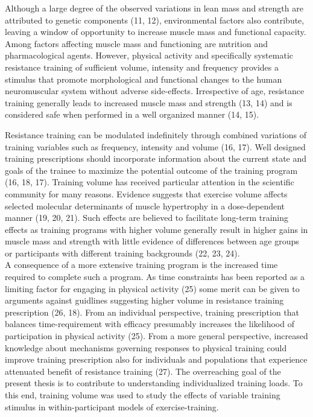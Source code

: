 \documentclass[twoside,10pt]{gihclass} %
\begin{document}
Although a large degree of the observed variations in lean mass and strength are attributed to genetic components
(11, 12),
environmental factors also contribute, leaving a window of opportunity to increase muscle mass and functional capacity. Among factors affecting muscle mass and functioning are nutrition and pharmacological agents. However, physical activity and specifically systematic resistance training of sufficient volume, intensity and frequency provides a stimulus that promote morphological and functional changes to the human neuromuscular system without adverse side-effects. Irrespective of age, resistance training generally leads to increased muscle mass and strength
(13, 14)
and is considered safe when performed in a well organized manner
(14, 15).

Resistance training can be modulated indefinitely through combined variations of training variables such as frequency, intensity and volume
(16, 17).
Well designed training prescriptions should incorporate information about the current state and goals of the trainee to maximize the potential outcome of the training program
(16, 18, 17).
Training volume has received particular attention in the scientific community for many reasons. Evidence suggests that exercise volume affects selected molecular determinants of muscle hypertrophy in a dose-dependent manner
(19, 20, 21).
Such effects are believed to facilitate long-term training effects as training programs with higher volume generally result in higher gains in muscle mass and strength with little evidence of differences between age groups or participants with different training backgrounds
(22, 23, 24). \\
A consequence of a more extensive training program is the increased time required to complete such a program. As time constraints has been reported as a limiting factor for engaging in physical activity
(25)
some merit can be given to arguments against guidlines suggesting higher volume in resistance training prescription
(26, 18).
From an individual perspective, training prescription that balances time-requirement with efficacy presumably increases the likelihood of participation in physical activity (25).
From a more general perspective, increased knowledge about mechanisms governing responses to physical training could improve training prescription also for individuals and populations that experience attenuated benefit of resistance training
(27).
The overreaching goal of the present thesis is to contribute to understanding individualized training loads. To this end, training volume was used to study the effects of variable training stimulus in within-participant models of exercise-training.
\end{document}

